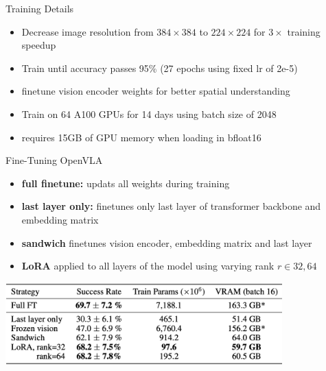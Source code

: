\documentclass{beamer}
\begin{document}
\begin{frame}[t]{Training Details}
    \begin{itemize}[label=-]
        \item Decrease image resolution from $384 \times 384$ to $224 \times 224$ for $3\times$ training speedup
        \item Train until accuracy passes 95\% (27 epochs using fixed lr of 2e-5)
        \item finetune vision encoder weights for better spatial understanding
        \item Train on 64 A100 GPUs for 14 days using batch size of 2048
        \item requires 15GB of GPU memory when loading in bfloat16
    \end{itemize}
\end{frame}
\begin{frame}[t]{Fine-Tuning OpenVLA}
    \begin{itemize}[label=-]
        \item \textbf{full finetune:} updats all weights during training
        \item \textbf{last layer only:} finetunes only last layer of transformer backbone and embedding matrix
        \item \textbf{sandwich} finetunes vision encoder, embedding matrix and last layer 
        \item \textbf{LoRA} applied to all layers of the model using varying rank $r \in {32, 64}$
    \end{itemize}
    \begin{center}
        \includegraphics[width=0.8\textwidth]{./img/openvla_sft.png}
    \end{center}
\end{frame}
\end{document}
